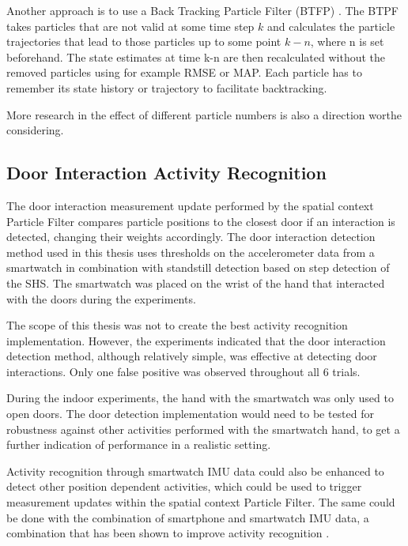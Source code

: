 Another approach is to use a Back Tracking Particle Filter (BTFP) . The BTPF takes particles that are not valid at some time step $ k $ and calculates the particle trajectories that lead to those particles up to some point $ k - n $, where n is set beforehand. The state estimates at time k-n are then recalculated without the removed particles using for example RMSE or MAP. Each particle has to remember its state history or trajectory to facilitate backtracking. 

More research in the effect of different particle numbers is also a direction worthe considering.

\subsection{Door Interaction Activity Recognition}

The door interaction measurement update performed by the spatial context Particle Filter compares particle positions to the closest door if an interaction is detected, changing their weights accordingly. The door interaction detection method used in this thesis uses thresholds on the accelerometer data from a smartwatch in combination with standstill detection based on step detection of the \ac{SHS}. The smartwatch was placed on the wrist of the hand that interacted with the doors during the experiments.\par 

The scope of this thesis was not to create the best activity recognition implementation. However, the experiments indicated that the door interaction detection method, although relatively simple, was effective at detecting door interactions. Only one false positive was observed throughout all 6 trials. \par 

During the indoor experiments, the hand with the smartwatch was only used to open doors. The door detection implementation would need to be tested for robustness against other activities performed with the smartwatch hand, to get a further indication of performance in a realistic setting. \par 

Activity recognition through smartwatch IMU data could also be enhanced to detect other position dependent activities, which could be used to trigger measurement updates within the spatial context Particle Filter. The same could be  done with the combination of smartphone and smartwatch IMU data, a combination that has been shown to improve activity recognition \cite{Shoaib2016}.

